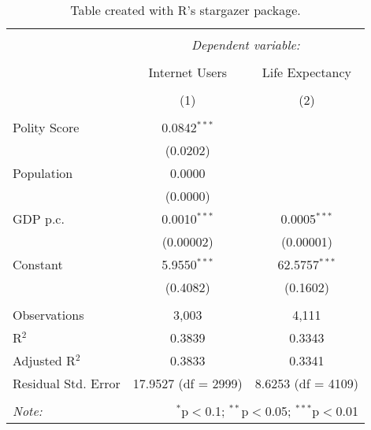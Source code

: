 
\begin{table}[!htbp] \centering 
  \caption{Table created with R's stargazer package.} 
  \label{} 
\scriptsize 
\begin{tabular}{@{\extracolsep{0pt}}lcc} 
\\[-1.8ex]\hline 
\hline \\[-1.8ex] 
 & \multicolumn{2}{c}{\textit{Dependent variable:}} \\ 
\cline{2-3} 
\\[-1.8ex] & Internet Users & Life Expectancy \\ 
\\[-1.8ex] & (1) & (2)\\ 
\hline \\[-1.8ex] 
 Polity Score & 0.0842$^{***}$ &  \\ 
  & (0.0202) &  \\ 
  Population & 0.0000 &  \\ 
  & (0.0000) &  \\ 
  GDP p.c. & 0.0010$^{***}$ & 0.0005$^{***}$ \\ 
  & (0.00002) & (0.00001) \\ 
  Constant & 5.9550$^{***}$ & 62.5757$^{***}$ \\ 
  & (0.4082) & (0.1602) \\ 
 \hline \\[-1.8ex] 
Observations & 3,003 & 4,111 \\ 
R$^{2}$ & 0.3839 & 0.3343 \\ 
Adjusted R$^{2}$ & 0.3833 & 0.3341 \\ 
Residual Std. Error & 17.9527 (df = 2999) & 8.6253 (df = 4109) \\ 
\hline 
\hline \\[-1.8ex] 
\textit{Note:}  & \multicolumn{2}{r}{$^{*}$p$<$0.1; $^{**}$p$<$0.05; $^{***}$p$<$0.01} \\ 
\end{tabular} 
\end{table} 
